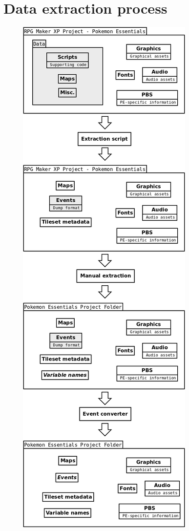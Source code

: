 \documentclass[11pt]{article}
\begin{document}
\section{Data extraction process}
\begin{figure}
	\begin{center}
		\includegraphics[width=1\linewidth]{Steps}
	\end{center}
\end{figure}
\end{document}
